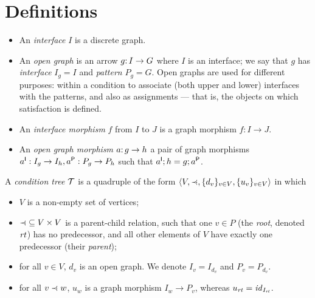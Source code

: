 \section{Definitions}
\label{sec:definitions}

\begin{itemize}
\item An \emph{interface} $I$ is a discrete graph.

\item An \emph{open graph} is an arrow $g{:}\, I\rightarrow G$ where $I$ is an interface; we say that $g$ has \emph{interface} $I_g=I$ and \emph{pattern} $P_g=G$. Open graphs are used for different purposes: within a condition to associate (both upper and lower) interfaces with the patterns, and also as assignments --- that is, the objects on which satisfaction is defined.

\item An \emph{interface morphism} $f$ from $I$ to $J$ is a graph morphism $f:I\to J$.

\item An \emph{open graph morphism} $a{:}\, g\rightarrow h$ a pair of graph morphisms $a^{\mathsf I}:I_g\rightarrow I_h, a^{\mathsf P}:P_g\rightarrow P_h$ such that $a^{\mathsf I};h=g;a^{\mathsf P}$.
\end{itemize}
%
\begin{definition}\label{def:condition tree}
A \emph{condition tree} ${\mathcal{T}}$ is a quadruple of the form $\tupof{V, {\parentof}, \setof{d_v}_{v\in V}, \setof{u_v}_{v\in V}}$ in which

\begin{itemize}[topsep=\itemsep]
\item $V$ is a non-empty set of vertices;

\item ${\parentof}\subseteq V\times V$ is a parent-child relation, such that one $v\in P$ (the \emph{root}, denoted $\mathit{rt}$) has no predecessor, and all other elements of $V$ have exactly one predecessor (their \emph{parent});

\item for all $v\in V$, $d_v$ is an open graph. We denote $I_v=I_{d_v}$ and $P_v=P_{d_v}$.

\item for all $v\parentof w$, $u_w$ is a graph morphism $I_w\to P_v$, whereas $u_{\mathit{rt}}={\mathit{id}}_{I_{\mathit{rt}}}$.
\end{itemize}
\end{definition}
%
